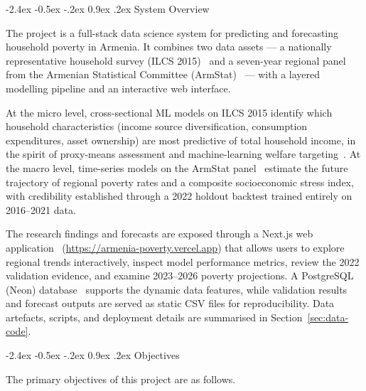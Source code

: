 \documentclass[12pt]{article}
\makeatletter
\renewcommand\subsection{%
  \@startsection{subsection}{2}{\z@}%
    {-2.4ex \@plus -0.5ex \@minus -.2ex}%
    {0.9ex \@plus .2ex}%
    {\color{steelblue}\normalsize\bfseries}}
\makeatother
\begin{document}
\subsection{System Overview}

\indent\hspace*{1em}
The project is a full-stack data science system for predicting and forecasting
household poverty in Armenia. It combines two data assets --- a nationally
representative household survey (ILCS 2015)~\cite{ilcs2015} and a seven-year regional panel from
the Armenian Statistical Committee (ArmStat)~\cite{armstat} --- with a layered modelling
pipeline and an interactive web interface.

At the micro level, cross-sectional ML models on ILCS 2015 identify which
household characteristics (income source diversification, consumption expenditures,
asset ownership) are most predictive of total household income, in the spirit of
proxy-means assessment and machine-learning welfare targeting~\cite{wb2015pmt,mcbride2018}.
At the macro
level, time-series models on the ArmStat panel~\cite{armstat} estimate the future trajectory of
regional poverty rates and a composite socioeconomic stress index, with
credibility established through a 2022 holdout backtest trained entirely on
2016--2021 data.

The research findings and forecasts are exposed through a Next.js web application~\cite{nextjs}
(\url{https://armenia-poverty.vercel.app}) that allows users to explore regional trends interactively, inspect model
performance metrics, review the 2022 validation evidence, and examine
2023--2026 poverty projections. A PostgreSQL (Neon) database~\cite{neon} supports the dynamic
data features, while validation results and forecast outputs are served as static
CSV files for reproducibility. Data artefacts, scripts, and deployment details are summarised in
Section~\ref{sec:data-code}.

\subsection{Objectives}

\indent\hspace*{1em}
The primary objectives of this project are as follows.
\end{document}
